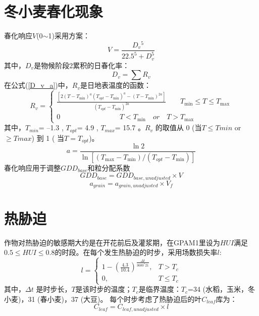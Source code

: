 \section{冬小麦春化现象}
春化响应$V$(0$\sim$1)采用\citet{streck2003incorporating}方案：
\begin{equation}
V=\frac{D_{v}{ }^{5}}{22.5^{5}+D_{v}^{5}}
\end{equation}
其中，$D_v$是物候阶段2累积的日春化率：
\begin{equation}\label{D_v_a}
D_{v}=\sum R_{v}
\end{equation}
在公式(\ref{D_v_a})中，$R_{v}$是日地表温度的函数：
\begin{equation}
R_{v}=\left\{\begin{array}{c}\frac{\left[2\left(T-T_{\min }\right)^{a}\left(T_{{opt}}-T_{\min }\right)^{a}-\left(T-T_{\min }\right)^{2 a}\right]}{\left(T_{{opt}}-T_{\min }\right)^{2 a}} \ \ \ \ \ \ \ \ \    T_{\min } \leq T \leq T_{\max }\\
 0   \ \ \  \ \ \ \ \ \ \ \ \ \    \ \ \ \ \   \ \ \ \ \ \ \ \ \ \ \ \ \ \ \  \ \ \ \ \    T<T_{\min } \quad  { or } \quad T>T_{\max }
\end{array}\right.
\end{equation}
其中，$T_{min}$= –1.3 \textcelsius, $T_{opt}$= 4.9 \textcelsius, $T_{max}$= 15.7 \textcelsius。$ R_v$ 的取值从 0 (当$ T\leq Tmin$ or $ \geq  Tmax$) 到 1 ( 当$T=T_{opt}$)。
\begin{equation}
a=\frac{\ln 2}{\ln \left[\left(T_{\max }-T_{\min }\right) /\left(T_{o p t}-T_{\min }\right)\right]}
\end{equation}
春化响应用于调整$GDD_{base}$和粒分配系数
\begin{equation}
G D D_{b a s e}=G D D_{b a s e,  { unadjusted }} \times V
\end{equation}
\begin{equation}
a_{ {grain }}=a_{ {grain,unadjusted }} \times V_{f}
\end{equation}


\section{热胁迫}
作物对热胁迫的敏感期大约是在开花前后及灌浆期，在GPAM1里设为$HUI $满足$0.5 \leq HUI \leq 0.8$的时段。在每个发生热胁迫的时步，采用场数损失率$l$:
\begin{equation}
l=\left\{\begin{array}{cc}1-\left(\frac{4.3}{10.4}\right)^{\frac{\Delta t}{3600^{*} 21}}, & T>T_{c} \\ 0, & T \leq T_{c}\end{array}\right.
\end{equation}
其中，$\Delta t$ 是时步长，$T$是该时步的温度；$T_c$是临界温度：$T_c$=34 \textcelsius (水稻，玉米，冬小麦)，31 \textcelsius (春小麦)，37 \textcelsius (大豆)。
每个时步考虑了热胁迫后的叶$C_{leaf}$库为：
\begin{equation}
C_{leaf}=C_{leaf,  {unadjusted}} \times l
\end{equation}


